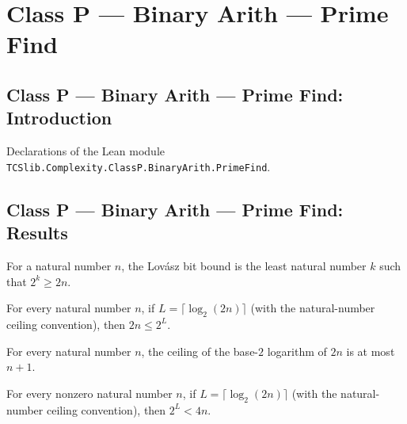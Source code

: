 \section{Class P --- Binary Arith --- Prime Find}
\subsection*{Class P --- Binary Arith --- Prime Find: Introduction}

Declarations of the Lean module \texttt{TCSlib.Complexity.ClassP.BinaryArith.PrimeFind}.

\subsection*{Class P --- Binary Arith --- Prime Find: Results}

\begin{definition}
\label{Complexity.BinArith.lovaszBits}
\leanok
For a natural number $n$, the Lovász bit bound is the least natural number $k$ such that
$2^k
\ge 2n$.
\end{definition}

\begin{theorem}
\label{Complexity.BinArith.two_mul_le_two_pow_lovaszBits}
\leanok
{}
For every natural number $n$, if $L=\lceil\log_2(2n)\rceil$ (with the natural-number
ceiling convention), then $2n \le 2^L$.
\end{theorem}

\begin{theorem}
\label{Complexity.BinArith.lovaszBits_le}
\leanok
{}
For every natural number $n$, the ceiling of the base-$2$ logarithm of $2n$ is at most
$n+1$.
\end{theorem}

\begin{theorem}
\label{Complexity.BinArith.two_pow_lovaszBits_lt}
\leanok
{}
For every nonzero natural number $n$, if $L=\lceil\log_2(2n)\rceil$ (with the
natural-number ceiling convention), then $2^L < 4n$.
\end{theorem}

